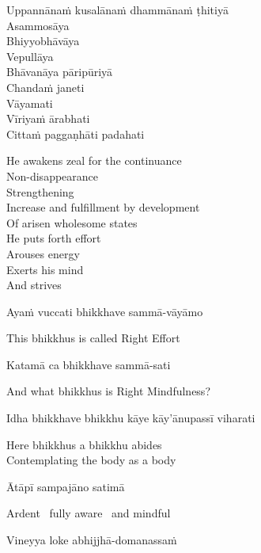 Uppannānaṁ kusalānaṁ dhammānaṁ ṭhitiyā\\
Asammosāya\\
Bhiyyobhāvāya\\
Vepullāya\\
Bhāvanāya pāripūriyā\\
Chandaṁ janeti\\
Vāyamati\\
Vīriyaṁ ārabhati\\
Cittaṁ paggaṇhāti padahati

  \ifbfive\clearpage\fi

\begin{english-verses}
  He awakens zeal for the continuance\\
  Non-disappearance\\
  Strengthening\\
  Increase and fulfillment by development\\
  Of arisen wholesome states\\
  He puts forth effort\\
  Arouses energy\\
  Exerts his mind\\
  And strives
\end{english-verses}

Ayaṁ vuccati bhikkhave sammā-vāyāmo

\begin{english}
  This bhikkhus is called Right Effort
\end{english}

Katamā ca bhikkhave sammā-sati

\begin{english}
  And what bhikkhus is Right Mindfulness?
\end{english}

\ifninebythirteen\clearpage\fi

Idha bhikkhave bhikkhu kāye kāy'ānupassī viharati

\begin{english}
  Here bhikkhus a bhikkhu abides\\
  Contemplating the body as a body
\end{english}

Ātāpī sampajāno satimā

\begin{english}
  Ardent \breathmark\ fully aware \breathmark\ and mindful
\end{english}

Vineyya loke abhijjhā-domanassaṁ

